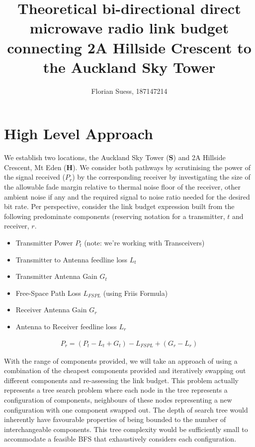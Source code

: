 \documentclass{article}
\title{Theoretical bi-directional direct microwave radio link budget connecting 2A Hillside Crescent to the Auckland Sky Tower}
\author{Florian Suess, 187147214}
\begin{document}
\maketitle

\section*{High Level Approach}
We establish two locations, the Auckland Sky Tower ($\boldsymbol{S}$) and 2A Hillside Crescent, Mt Eden ($\boldsymbol{H}$). We consider both pathways by scrutinising the power of the signal received ($P_r$) by the corresponding receiver by investigating the size of the allowable fade margin relative to thermal noise floor of the receiver, other ambient noise if any and the required signal to noise ratio needed for the desired bit rate. Per perspective, consider the link budget expression built from the following predominate components (reserving notation for a transmitter, $t$ and receiver, $r$.

\begin{itemize}
				\item Transmitter Power $P_t$ (note: we're working with Transceivers)
				\item Transmitter to Antenna feedline loss $L_t$
				\item Transmitter Antenna Gain $G_t$
				\item Free-Space Path Loss $L_{FSPL}$ (using Friis Formula)
				\item Receiver Antenna Gain $G_r$
				\item Antenna to Receiver feedline loss $L_r$
\end{itemize}

\begin{align*}
				P_r = (P_t - L_t + G_t ) - L_{FSPL} + (G_r - L_{r})
\end{align*}

With the range of components provided, we will take an approach of using a combination of the cheapest components provided and iteratively swapping out different components and re-assessing the link budget. This problem actually represents a tree search problem where each node in the tree represents a configuration of components, neighbours of these nodes representing a new configuration with one component swapped out. The depth of search tree would inherently have favourable properties of being bounded to the number of interchangeable components. This tree complexity would be sufficiently small to accommodate a feasible BFS that exhaustively considers each configuration.
\end{document}
